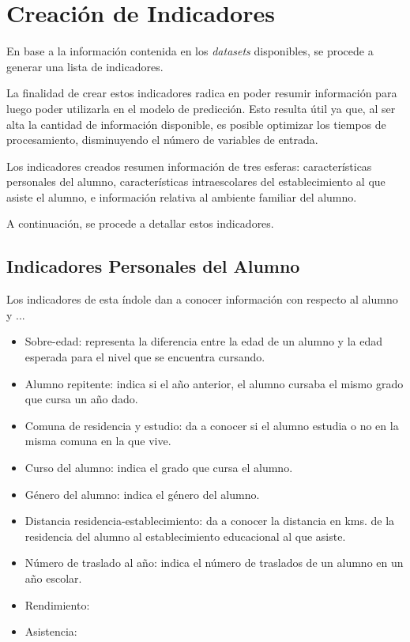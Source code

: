 \section{Creación de Indicadores}
En base a la información contenida en los \textit{datasets} disponibles, se procede a generar una lista de indicadores. 

La finalidad de crear estos indicadores radica en poder resumir información para luego poder utilizarla en el modelo de predicción. Esto resulta útil ya que, al ser alta la cantidad de información disponible, es posible optimizar los tiempos de procesamiento, disminuyendo el número de variables de entrada. 

Los indicadores creados resumen información de tres esferas: características personales del alumno, características intraescolares del establecimiento al que asiste el alumno, e información relativa al ambiente familiar del alumno. 

A continuación, se procede a detallar estos indicadores.

\subsection{Indicadores Personales del Alumno}
Los indicadores de esta índole dan a conocer información con respecto al alumno y ...

\begin{itemize}
\item Sobre-edad: representa la diferencia entre la edad de un alumno y la edad esperada para el nivel que se encuentra cursando.
\item Alumno repitente: indica si el año anterior, el alumno cursaba el mismo grado que cursa un año dado.
\item Comuna de residencia y estudio: da a conocer si el alumno estudia o no en la misma comuna en la que vive.
\item Curso del alumno: indica el grado que cursa el alumno.
\item Género del alumno: indica el género del alumno.
\item Distancia residencia-establecimiento: da a conocer la distancia en kms. de la residencia del alumno al establecimiento educacional al que asiste.
\item Número de traslado al año: indica el número de traslados de un alumno en un año escolar. 
\item Rendimiento:
\item Asistencia: 
\end{itemize}


